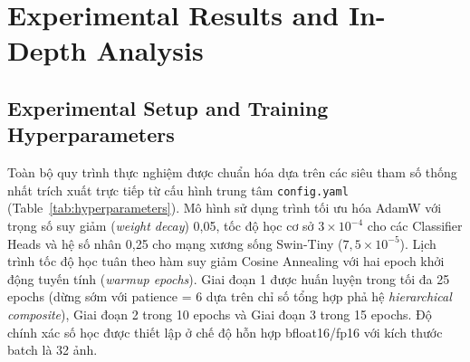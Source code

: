 \documentclass[runningheads]{llncs}
\begin{document}
\FloatBarrier
\section{Experimental Results and In-Depth Analysis}
\label{sec:experiments}

\subsection{Experimental Setup and Training Hyperparameters}
Toàn bộ quy trình thực nghiệm được chuẩn hóa dựa trên các siêu tham số thống nhất trích xuất trực tiếp từ cấu hình trung tâm \texttt{config.yaml} (Table~\ref{tab:hyperparameters}). Mô hình sử dụng trình tối ưu hóa AdamW với trọng số suy giảm (\textit{weight decay}) 0,05, tốc độ học cơ sở $3 \times 10^{-4}$ cho các Classifier Heads và hệ số nhân 0,25 cho mạng xương sống Swin-Tiny ($7{,}5 \times 10^{-5}$). Lịch trình tốc độ học tuân theo hàm suy giảm Cosine Annealing với hai epoch khởi động tuyến tính (\textit{warmup epochs}). Giai đoạn 1 được huấn luyện trong tối đa 25 epochs (dừng sớm với patience = 6 dựa trên chỉ số tổng hợp phả hệ \textit{hierarchical composite}), Giai đoạn 2 trong 10 epochs và Giai đoạn 3 trong 15 epochs. Độ chính xác số học được thiết lập ở chế độ hỗn hợp bfloat16/fp16 với kích thước batch là 32 ảnh.
\end{document}
